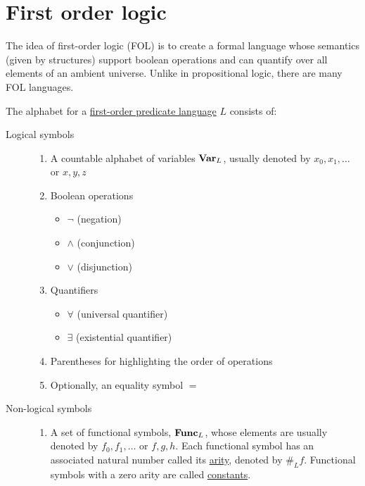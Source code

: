\section{First order logic}\label{sec:first_order_logic}

The idea of first-order logic (FOL) is to create a formal language whose semantics (given by structures) support boolean operations and can quantify over all elements of an ambient universe. Unlike in propositional logic, there are many FOL languages.

\begin{definition}\label{def:first_order_language}\cite[definition 2.1]{Nerode2012}
  The alphabet for a \uline{first-order predicate language} $L$ consists of:
  \begin{description}
    \item[Logical symbols]
    \mbox{}
    \begin{enumerate}
      \item A countable alphabet of variables $\operatorname{\mathbf{Var}}_L$, usually denoted by $x_0, x_1, \ldots$ or $x, y, z$

      \item Boolean operations
      \begin{itemize}
        \item $\neg$ (negation)
        \item $\land$ (conjunction)
        \item $\lor$ (disjunction)
      \end{itemize}

      \item Quantifiers
      \begin{itemize}
        \item $\forall$ (universal quantifier)
        \item $\exists$ (existential quantifier)
      \end{itemize}

      \item Parentheses for highlighting the order of operations

      \item Optionally, an equality symbol $=$
    \end{enumerate}

    \item[Non-logical symbols]
    \mbox{}
    \begin{enumerate}
      \item A set of functional symbols, $\operatorname{\mathbf{Func}}_L$, whose elements are usually denoted by $f_0, f_1, \ldots$ or $f, g, h$. Each functional symbol has an associated natural number called its \uline{arity}, denoted by $\#_L f$. Functional symbols with a zero arity are called \uline{constants}.


\end{enumerate}
\end{description}
\end{definition}
